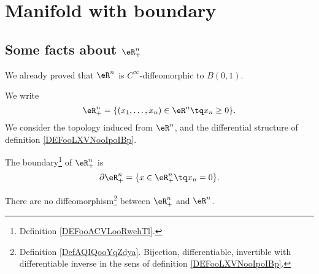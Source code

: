 \section{Manifold with boundary}


\subsection{Some facts about \( \eR^n_+\)}

We already proved that \( \eR^n\) is \( C^{\infty}\)-diffeomorphic to \( B(0,1)\).

We write
\begin{equation}
	\eR_+^n=\{ (x_1,\ldots,x_n)\in \eR^n\tq x_n\geq 0 \}.
\end{equation}
We consider the topology induced from \( \eR^n\), and the differential structure of definition \ref{DEFooLXVNooIpoIBp}.

\begin{lemma}	\label{LEMooBICBooFUQyYA}
	The boundary\footnote{Definition \ref{DEFooACVLooRwehTl}.} of \( \eR^n_+\) is
	\begin{equation}
		\partial \eR^n_+=\{ x\in \eR^n_+\tq x_n=0 \}.
	\end{equation}
\end{lemma}


\begin{proposition}	\label{PROPooPUREooSkeyxs}
	There are no diffeomorphism\footnote{Definition \ref{DefAQIQooYqZdya}. Bijection, differentiable, invertible with differentiable inverse in the sens of definition \ref{DEFooLXVNooIpoIBp}.} between \( \eR^n_+\) and \( \eR^n\).
\end{proposition}

